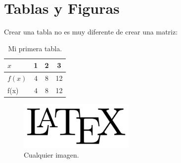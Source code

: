 \documentclass{article}
\begin{document}
\section{Tablas y Figuras}

Crear una tabla no es muy diferente de crear una matriz:

\begin{table}[h!]
	\caption{Mi primera tabla.}
	\centering
	\begin{tabular}{|l||c|c|c|}
		\hline
		\textbf{\(x\)} & 1 & 2 & 3 \\
		\hline
		\(f(x)\) & 4 & 8 & 12 \\
		f(x) & 4 & 8 & 12 \\
		\hline
	\end{tabular}
	
\end{table}

\begin{figure}[h!]
	\centering
		\includegraphics[width=0.5\textwidth]{imagen.png}
	\caption{Cualquier imagen.}
\end{figure}
\end{document}
